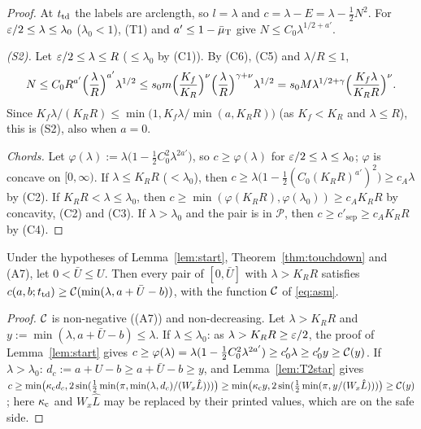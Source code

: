 \begin{proof}
At $t_{\mathrm{td}}$ the labels are arclength, so $l=\lambda$ and $c=\lambda-E=\lambda-\frac12N^2$. For $\varepsilon/2\le\lambda\le\lambda_0$
($\lambda_0<1$), (T1) and $a'\le1-\bar\mu_{\mathrm T}$ give $N\le C_0\lambda^{1/2+a'}$.

\emph{(S2).} Let $\varepsilon/2\le\lambda\le R$ ($\le\lambda_0$ by (C1)). By (C6), (C5) and $\lambda/R\le1$,
\[
N\le C_0R^{a'}\Bigl(\frac\lambda R\Bigr)^{a'}\lambda^{1/2}\le s_0m\Bigl(\frac{K_f}{K_R}\Bigr)^\nu\Bigl(\frac\lambda R\Bigr)^{\gamma+\nu}\lambda^{1/2}
=s_0M\lambda^{1/2+\gamma}\Bigl(\frac{K_f\lambda}{K_RR}\Bigr)^\nu .
\]
Since $K_f\lambda/(K_RR)\le\min\bigl(1,K_f\lambda/\min(a,K_RR)\bigr)$ (as $K_f<K_R$ and $\lambda\le R$), this is (S2), also when $a=0$.

\emph{Chords.} Let $\varphi(\lambda):=\lambda\bigl(1-\frac12C_0^2\lambda^{2a'}\bigr)$, so $c\ge\varphi(\lambda)$ for
$\varepsilon/2\le\lambda\le\lambda_0$; $\varphi$ is concave on $[0,\infty)$. If $\lambda\le K_RR$ ($<\lambda_0$), then
$c\ge\lambda\bigl(1-\frac12(C_0(K_RR)^{a'})^2\bigr)\ge c_A\lambda$ by (C2). If $K_RR<\lambda\le\lambda_0$, then
$c\ge\min(\varphi(K_RR),\varphi(\lambda_0))\ge c_AK_RR$ by concavity, (C2) and (C3). If $\lambda>\lambda_0$ and the pair is in
$\mathcal P$, then $c\ge c'_{\mathrm{sep}}\ge c_AK_RR$ by (C4).
\end{proof}

\begin{lemma}\label{lem:S1G}
Under the hypotheses of Lemma~\ref{lem:start}, Theorem~\ref{thm:touchdown} and \textup{(A7)}, let $0<\bar U\le U$. Then every pair of
$[0,\bar U]$ with $\lambda>K_RR$ satisfies $c(a,b;t_{\mathrm{td}})\ge\mathcal C(\min(\lambda,a+\bar U-b))$, with the function $\mathcal C$ of \eqref{eq:asm}.
\end{lemma}

\begin{proof}
$\mathcal C$ is non-negative ((A7)) and non-decreasing. Let $\lambda>K_RR$ and $y:=\min(\lambda,a+\bar U-b)\le\lambda$. If $\lambda\le\lambda_0$:
as $\lambda>K_RR\ge\varepsilon/2$, the proof of Lemma~\ref{lem:start} gives $c\ge\varphi(\lambda)=\lambda(1-\frac12C_0^2\lambda^{2a'})\ge c_0'\lambda\ge
c_0'y\ge\mathcal C(y)$. If $\lambda>\lambda_0$: $d_c:=a+U-b\ge a+\bar U-b\ge y$, and Lemma~\ref{lem:T2star} gives
$c\ge\min\bigl(\kappa_{\mathrm c} d_c,2\sin(\frac12\min(\pi,\min(\lambda,d_c)/(W_x\hat L)))\bigr)\ge\min\bigl(\kappa_{\mathrm c} y,2\sin(\frac12\min(\pi,y/(W_x\hat L)))\bigr)
\ge\mathcal C(y)$; here $\kappa_{\mathrm c}$ and $W_x\hat L$ may be replaced by their printed values, which are on the safe side.
\end{proof}

